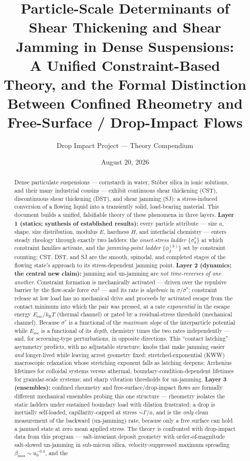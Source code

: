 \documentclass[11pt]{article}
\title{\textbf{Particle-Scale Determinants of Shear Thickening and Shear Jamming in Dense Suspensions:}\\[4pt]
\large A Unified Constraint-Based Theory, and the Formal Distinction Between Confined Rheometry and Free-Surface / Drop-Impact Flows}
\author{Drop Impact Project --- Theory Compendium}
\date{August 20, 2026}
\newcommand{\phiJ}{\phi_{\mathrm{J}}}
\newcommand{\sigmastar}{\sigma^{*}}
\begin{document}
\maketitle

\begin{abstract}
\noindent
Dense particulate suspensions --- cornstarch in water, St\"ober silica in ionic solutions, and their many industrial cousins --- exhibit continuous shear thickening (CST), discontinuous shear thickening (DST), and shear jamming (SJ): a stress-induced conversion of a flowing liquid into a transiently solid, load-bearing material. This document builds a unified, falsifiable theory of these phenomena in three layers. \textbf{Layer 1 (statics; synthesis of established results):} every particle attribute --- size $a$, shape, size distribution, modulus $E$, hardness $H$, and interfacial chemistry --- enters steady rheology through exactly two ladders: the \emph{onset-stress ladder} $\{\sigmastar_k\}$ at which constraint families activate, and the \emph{jamming-point ladder} $\{\phiJ^{(k)}\}$ set by constraint counting; CST, DST, and SJ are the smooth, spinodal, and completed stages of the flowing state's approach to its stress-dependent jamming point. \textbf{Layer 2 (dynamics; the central new claim):} jamming and un-jamming are \emph{not time-reverses of one another}. Constraint formation is mechanically activated --- driven over the repulsive barrier by the flow-scale force $\sigma a^2$ --- and its rate is \emph{algebraic} in $\sigma/\sigmastar$; constraint release at low load has no mechanical drive and proceeds by activated escape from the contact minimum into which the pair was pressed, at a rate \emph{exponential} in the escape energy $E_{\mathrm{esc}}/k_{\mathrm{B}}T$ (thermal channel) or gated by a residual-stress threshold (mechanical channel). Because $\sigmastar$ is a functional of the \emph{maximum slope} of the interparticle potential while $E_{\mathrm{esc}}$ is a functional of its \emph{depth}, chemistry tunes the two rates independently --- and, for screening-type perturbations, in opposite directions. This ``contact latching'' asymmetry predicts, with no adjustable structure: knobs that make jamming easier \emph{and} longer-lived while leaving arrest geometry fixed; stretched-exponential (KWW) macroscopic relaxation whose stretching exponent falls as latching deepens; Arrhenius lifetimes for colloidal systems versus athermal, boundary-condition-dependent lifetimes for granular-scale systems; and sharp vibration thresholds for un-jamming. \textbf{Layer 3 (ensembles):} confined rheometry and free-surface/drop-impact flows are formally different mechanical ensembles probing this one structure --- rheometry isolates the static ladders under sustained boundary load with dilation frustrated; a drop is inertially self-loaded, capillarity-capped at stress $\sim\Gamma/a$, and is the \emph{only} clean measurement of the backward (un-jamming) rate, because only a free surface can hold a jammed state at zero mean applied stress. The theory is confronted with drop-impact data from this program --- salt-invariant deposit geometry with order-of-magnitude salt-slowed un-jamming in sub-micron silica, velocity-suppressed maximum spreading $\beta_{\max}\!\sim\!u_0^{-0.4}$, and the 
\end{abstract}
\end{document}
